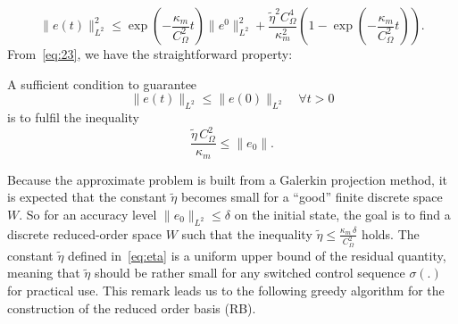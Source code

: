 %
\begin{equation}
\|e(t)\|_{L^2}^2 \leq \exp(-\frac{\kappa_m}{C_\Omega^2} t) \|e^0\|_{L^2}^2 
+ \frac{\tilde\eta^2 C_\Omega^4}{\kappa_m^2}\left( 1-\exp(-\frac{\kappa_m}{C_\Omega^2} t)\right).
\label{eq:23}
\end{equation} 
%
From~\eqref{eq:23}, we have the straightforward property:
\begin{proposition}
A sufficient condition to guarantee
\[
\|e(t)\|_{L^2} \leq \|e(0)\|_{L^2} \quad \forall t>0
\]
is to fulfil the inequality
%
\begin{equation}
\frac{\tilde\eta\, C_\Omega^2}{\kappa_m}\leq \|e_0\|.
\label{eq:24}
\end{equation}
\end{proposition}
%
\begin{remark}
Because the approximate problem is built from a Galerkin projection method, it is expected that the constant $\tilde \eta$ becomes small for a ``good'' finite discrete space $W$. 
So for an accuracy level $\|e_0\|_{L^2}\leq \delta$ on the initial state, the goal is to 
find a discrete reduced-order space $W$ such that the inequality
$\tilde\eta \leq \frac{\kappa_m \,\delta}{C_\Omega^2}$ holds.
The constant $\tilde\eta$ defined in~\eqref{eq:eta} is a uniform upper bound of the
residual quantity, meaning that $\tilde \eta$ should be rather small for any switched
control sequence $\sigma(.)$ for practical use. This remark leads us to the following 
greedy algorithm for the construction of the reduced order basis (RB). 
\end{remark}
%
%
%
%

